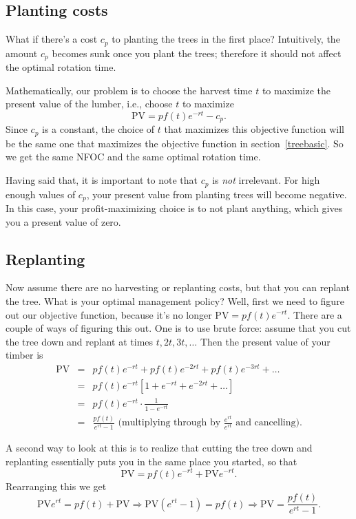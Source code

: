 \subsection*{Planting costs}

What if there's a cost $c_p$ to planting the trees in the first place? Intuitively, the amount $c_p$ becomes sunk once you plant the trees; therefore it should not affect the optimal rotation time.

Mathematically, our problem is to choose the harvest time $t$ to maximize the present value of the lumber, i.e., choose $t$ to maximize
\[
\mbox{PV}=pf(t)e^{-rt}-c_p.
\]
Since $c_p$ is a constant, the choice of $t$ that maximizes this objective function will be the same one that maximizes the objective function in section~\ref{treebasic}. So we get the same NFOC and the same optimal rotation time.

Having said that, it is important to note that $c_p$ is \emph{not} irrelevant. For high enough values of $c_p$, your present value from planting trees will become negative. In this case, your profit-maximizing choice is to not plant anything, which gives you a present value of zero.

\subsection*{Replanting}
\label{treereplantingbasic}

Now assume there are no harvesting or replanting costs, but that you can replant the tree. What is your optimal management policy? Well, first we need to figure out our objective function, because it's no longer $\mbox{PV}=pf(t)e^{-rt}$. There are a couple of ways of figuring this out. One is to use brute force: assume that you cut the tree down and replant at times $t, 2t, 3t,\ldots$ Then the present value of your timber is
\begin{eqnarray*}
\mbox{PV} & = & pf(t)e^{-rt}+pf(t)e^{-2rt}+pf(t)e^{-3rt}+\ldots \\
& = & pf(t)e^{-rt}\left[1 + e^{-rt} + e^{-2rt} +\ldots\right]\\
& = & pf(t)e^{-rt}\cdot \frac{1}{1-e^{-rt}}\\
& = & \frac{pf(t)}{e^{rt}-1} \mbox{ (multiplying through by }\frac{e^{rt}}{e^{rt}}\mbox{ and cancelling)}.
\end{eqnarray*}

A second way to look at this is to realize that cutting the tree down and replanting essentially puts you in the same place you started, so that
\[
\mbox{PV}  = pf(t)e^{-rt}+ \mbox{PV}e^{-rt}.
\]
Rearranging this we get
\[
\mbox{PV}e^{rt}=pf(t)+\mbox{PV}\Longrightarrow
\mbox{PV}(e^{rt}-1)=pf(t)\Longrightarrow \mbox{PV} =
\frac{pf(t)}{e^{rt}-1}.
\]

